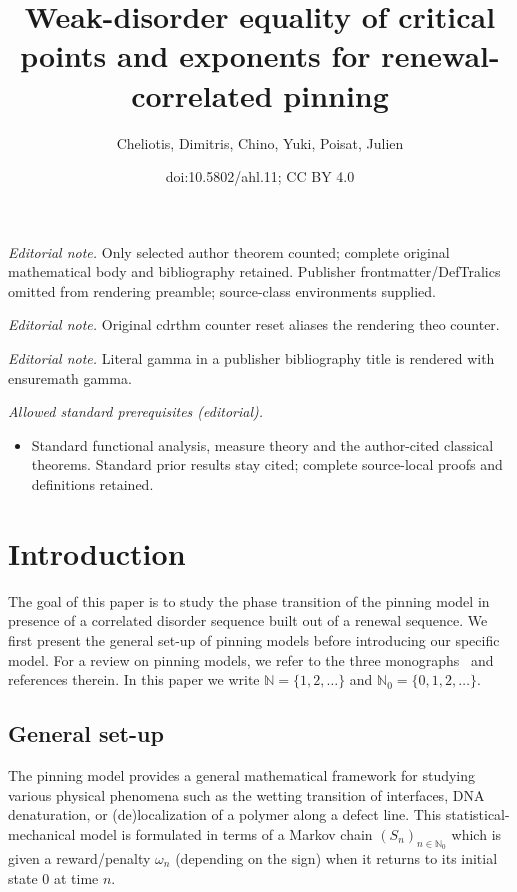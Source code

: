\documentclass[10pt]{amsart}
\title{Weak-disorder equality of critical points and exponents for renewal-correlated pinning}
\author{Cheliotis, Dimitris, Chino, Yuki, Poisat, Julien}
\date{doi:10.5802/ahl.11; CC BY 4.0}
\theoremstyle{definition}\newtheorem{defi}[theo]{Definition}\newtheorem{rema}[theo]{Remark}\newtheorem{exam}[theo]{Example}\newtheorem{exem}[theo]{Example}\newtheorem{nota}[theo]{Notation}
\newcommand{\bbN}{{\ensuremath{\mathbb N}}}
\begin{document}
\maketitle
\noindent\textit{Editorial note.} Only selected author theorem counted; complete original mathematical body and bibliography retained. Publisher frontmatter/DefTralics omitted from rendering preamble; source-class environments supplied.\par\medskip
\noindent\textit{Editorial note.} Original cdrthm counter reset aliases the rendering theo counter.\par\medskip
\noindent\textit{Editorial note.} Literal gamma in a publisher bibliography title is rendered with ensuremath gamma.\par\medskip
\noindent\textit{Allowed standard prerequisites (editorial).}\begin{itemize}
\item Standard functional analysis, measure theory and the author-cited classical theorems. Standard prior results stay cited; complete source-local proofs and definitions retained.
\end{itemize}\medskip


\section{Introduction}

The goal of this paper is to study the phase transition of the pinning model in presence of a correlated disorder sequence built out of a renewal sequence. We first present the general set-up of pinning models before introducing our specific model. For a review on pinning models, we refer to the three monographs~\cite{Gi2007, Gi2011, dH09} and references therein. In this paper we write $\bbN = \{1, 2, \ldots\}$ and $\bbN_0 = \{0, 1, 2,\ldots\}$.

\subsection{General set-up}

The pinning model provides a general mathematical framework for studying various physical phenomena such as the wetting transition of interfaces, DNA denaturation, or (de)localization of a polymer along a defect line. This statistical-mechanical model is formulated in terms of a Markov chain $(S_n)_{n\in\bbN_0}$ which is given a reward/penalty $\omega_n$ (depending on the sign) when it returns to its initial state $0$ at time $n$.
\end{document}
